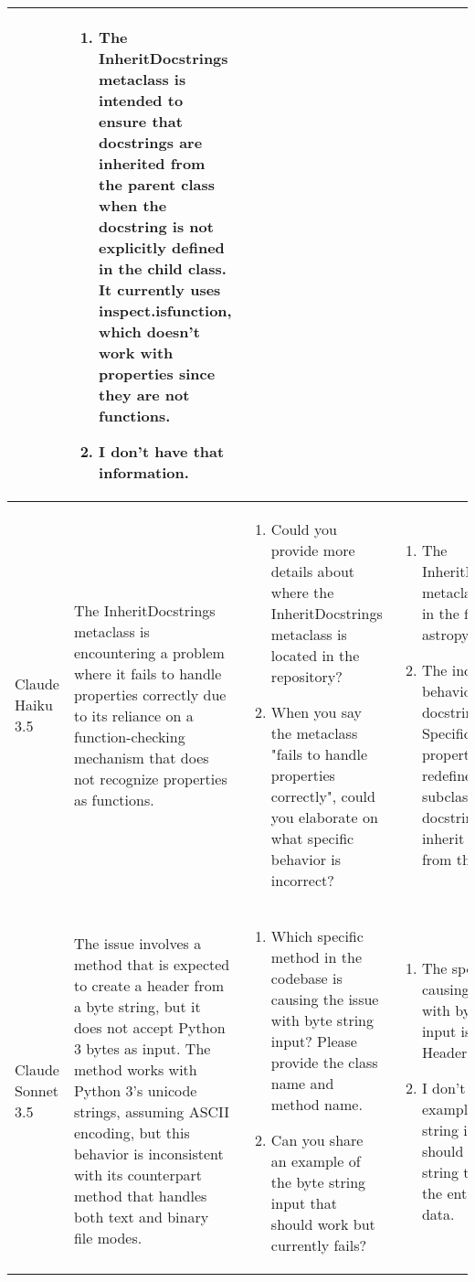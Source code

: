 \begin{table*}[ht]
\begin{tabular}{p{1.5cm} p{4.0cm} p{5.0cm} p{5.5cm}}
\begin{enumerate}
\end{enumerate}
& \begin{enumerate}
    \item The InheritDocstrings metaclass is intended to ensure that docstrings are inherited from the parent class when the docstring is not explicitly defined in the child class. It currently uses inspect.isfunction, which doesn't work with properties since they are not functions.
    \item I don't have that information.
\end{enumerate} \\
\hline
Claude Haiku 3.5 & The InheritDocstrings metaclass is encountering a problem where it fails to handle properties correctly due to its reliance on a function-checking mechanism that does not recognize properties as functions. & \begin{enumerate}
    \item Could you provide more details about where the InheritDocstrings metaclass is located in the repository? 
    \item When you say the metaclass "fails to handle properties correctly", could you elaborate on what specific behavior is incorrect? 
\end{enumerate}
  & \begin{enumerate}
    \item The InheritDocstrings metaclass is located in the file astropy/utils/misc.py.
    \item The incorrect behavior is related to docstring inheritance. Specifically, properties that are redefined in a subclass without a docstring do not inherit the docstring from the base class.
\end{enumerate} \\
\hline
Claude Sonnet 3.5 & The issue involves a method that is expected to create a header from a byte string, but it does not accept Python 3 bytes as input. The method works with Python 3's unicode strings, assuming ASCII encoding, but this behavior is inconsistent with its counterpart method that handles both text and binary file modes. & \begin{enumerate}
    \item Which specific method in the codebase is causing the issue with byte string input? Please provide the class name and method name.
    \item Can you share an example of the byte string input that should work but currently fails?
\end{enumerate}
  & \begin{enumerate}
    \item The specific method causing the issue with byte string input is Header.fromstring.
    \item I don't have a specific example of the byte string input, but it should be a byte string that contains the entire header data.


\end{enumerate}
\end{tabular}
\end{table*}
